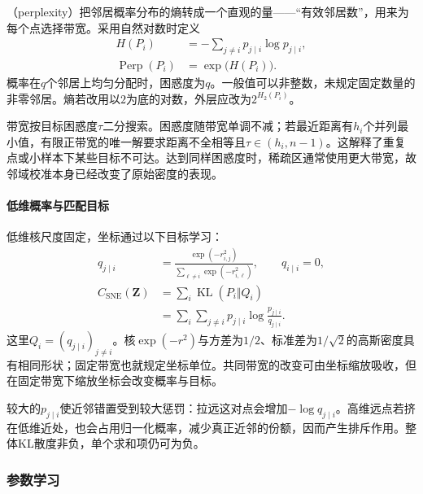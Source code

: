 （perplexity）把邻居概率分布的熵转成一个直观的量——“有效邻居数”，用来为每个点选择带宽。采用自然对数时定义
\begin{equation}
  \label{eq:dim-sne-perplexity}
  \begin{aligned}
    H(P_i)&=-\sum_{j\ne i}p_{j\mid i}\log p_{j\mid i},\\
    \operatorname{Perp}(P_i)&=\exp\!\bigl(H(P_i)\bigr).
  \end{aligned}
\end{equation}
概率在$q$个邻居上均匀分配时，困惑度为$q$。一般值可以非整数，未规定固定数量的非零邻居。熵若改用以$2$为底的对数，外层应改为$2^{H_2(P_i)}$。

带宽按目标困惑度$\tau$二分搜索。困惑度随带宽单调不减；若最近距离有$h_i$个并列最小值，有限正带宽的唯一解要求距离不全相等且$\tau\in(h_i,n-1)$。这解释了重复点或小样本下某些目标不可达。达到同样困惑度时，稀疏区通常使用更大带宽，故邻域校准本身已经改变了原始密度的表现。

\paragraph{低维概率与匹配目标}

低维核尺度固定，坐标通过以下目标学习：
\begin{equation}
  \label{eq:dim-sne-low-loss}
  \begin{aligned}
    q_{j\mid i}
      &=\frac{\exp(-r_{i,j}^2)}
      {\sum_{\ell\ne i}\exp(-r_{i,\ell}^2)},\qquad q_{i\mid i}=0,\\
    C_{\mathrm{SNE}}(\bm{Z})
      &=\sum_i\operatorname{KL}(P_i\Vert Q_i)\\
      &=\sum_i\sum_{j\ne i}p_{j\mid i}
        \log\frac{p_{j\mid i}}{q_{j\mid i}}.
  \end{aligned}
\end{equation}
这里$Q_i=(q_{j\mid i})_{j\ne i}$。核$\exp(-r^2)$与方差为$1/2$、标准差为$1/\sqrt{2}$的高斯密度具有相同形状；固定带宽也就规定坐标单位。共同带宽的改变可由坐标缩放吸收，但在固定带宽下缩放坐标会改变概率与目标。

较大的$p_{j\mid i}$使近邻错置受到较大惩罚：拉远这对点会增加$-\log q_{j\mid i}$。高维远点若挤在低维近处，也会占用归一化概率，减少真正近邻的份额，因而产生排斥作用。整体KL散度非负，单个求和项仍可为负。

\subsubsection{参数学习}

